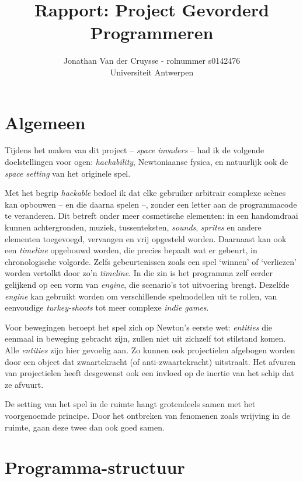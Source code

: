 \documentclass[10pt,a4paper]{article}
\author{Jonathan Van der Cruysse - rolnummer s0142476 \\ Universiteit Antwerpen}
\title{Rapport: Project Gevorderd Programmeren}
\begin{document}
	
\newcommand{\classname}[1]
{
	\selectlanguage{english}
	\textsf{#1}
	\selectlanguage{dutch}
}
	
\maketitle

\section{Algemeen}
Tijdens het maken van dit project 
-- \emph{space invaders} -- had ik de volgende
doelstellingen voor ogen: \emph{hackability}, 
Newtoniaanse fysica, en natuurlijk ook de \emph{space setting}
van het originele spel. 

Met het begrip \emph{hackable} bedoel ik dat elke gebruiker arbitrair
complexe sc\`enes kan opbouwen -- en die daarna spelen --, zonder een 
letter aan de programmacode te veranderen. 
Dit betreft onder meer cosmetische elementen: in een handomdraai
kunnen achtergronden, muziek, tussenteksten, \emph{sounds}, \emph{sprites}
en andere elementen toegevoegd, vervangen en vrij opgesteld worden.
Daarnaast kan ook een \emph{timeline} opgebouwd worden, die precies
bepaalt wat er gebeurt, in chronologische volgorde. 
Zelfs gebeurtenissen zoals een spel `winnen' of `verliezen' worden 
vertolkt door zo'n \emph{timeline}. In die zin is
het programma zelf eerder gelijkend op een vorm van \emph{engine}, die 
scenario's tot uitvoering brengt. Dezelfde \emph{engine} kan gebruikt
worden om verschillende spelmodellen uit te rollen, van eenvoudige
\emph{turkey-shoots} tot meer complexe \emph{indie games}.

Voor bewegingen beroept het spel zich op Newton's eerste wet: 
\emph{entities} die eenmaal in beweging gebracht zijn, zullen niet
uit zichzelf tot stilstand komen. Alle \emph{entities} zijn hier gevoelig
aan. Zo kunnen ook projectielen afgebogen worden door een object dat 
zwaartekracht (of anti-zwaartekracht) uitstraalt. Het afvuren van
projectielen heeft desgewenst ook een invloed op de inertie van het
schip dat ze afvuurt.

De setting van het spel in de ruimte hangt grotendeels samen met het 
voorgenoemde principe. Door het ontbreken van fenomenen zoals wrijving
in de ruimte, gaan deze twee dan ook goed samen.


\section{Programma-structuur}
\end{document}
